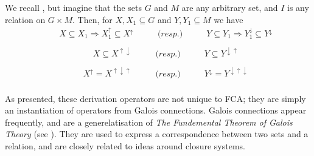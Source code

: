 \begin{proposition}
\label{proposition:properties-derivation-operators}
	We recall , but imagine that the sets $G$ and $M$ are any arbitrary set, and $I$ is any relation on $G \times M$. Then, for $X, X_1 \subseteq G$ and $Y, Y_1 \subseteq M$ we have
	\begin{equation}
    \begin{aligned}
    \label{equation:galois-1}
    & \quad X \subseteq X_1 \Rightarrow X_1^\uparrow \subseteq X^\uparrow \qquad & \textit{(resp.)} & \qquad Y \subseteq Y_1 \Rightarrow Y_1^\downarrow \subseteq Y^\downarrow \\
    \end{aligned}
    \end{equation}
    \begin{equation}
    \begin{aligned}
    & \quad X \subseteq X^{\uparrow \downarrow} \qquad & \textit{(resp.)} & \qquad Y \subseteq Y^{\downarrow \uparrow} \\
    \end{aligned}
    \end{equation}
    \begin{equation}
    \label{equation:galois-3}
    \begin{aligned}
    & \quad X^\uparrow = X^{\uparrow \downarrow \uparrow} \qquad & \textit{(resp.)} & \qquad Y^\downarrow = Y^{\downarrow \uparrow \downarrow} \\
     \end{aligned}
    \end{equation}
\end{proposition}

\clearpage

As presented, these derivation operators are not unique to FCA; they are simply an instantiation of operators from Galois connections. Galois connections appear frequently, and are a generelatisation of \textit{The Fundemental Theorem of Galois Theory} (see \cite[pp. 205]{bergman2015invitation}). They are used to express a correspondence between two sets and a relation, and are closely related to ideas around closure systems.











